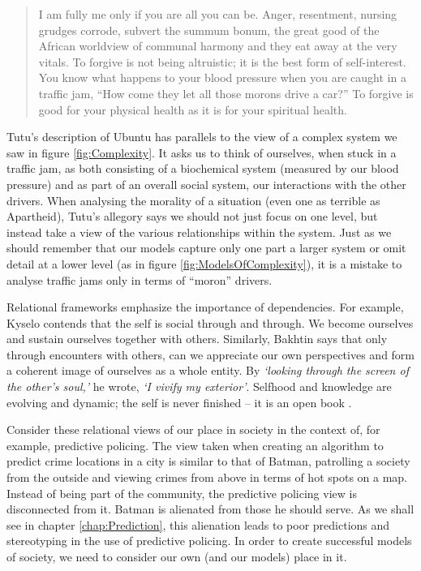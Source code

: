 \begin{quote}

I am fully me only if you are all you can be. Anger, resentment, nursing grudges corrode, subvert the summum bonum, the great good of the African worldview of communal harmony and they eat away at the very vitals. To forgive is not being altruistic; it is the best form of self-interest. You know what happens to your blood pressure when you are caught in a traffic jam, ``How come they let all those morons drive a car?'' To forgive is good for your physical health as it is for your spiritual health.

\end{quote}

Tutu's description of Ubuntu has parallels to the view of a complex system we saw in figure \ref{fig:Complexity}. It asks us to think of ourselves, when stuck in a traffic jam, as both consisting of a biochemical system (measured by our blood pressure) and as part of an overall social system, our interactions with the other drivers. When analysing the morality of a situation (even one as terrible as Apartheid), Tutu's allegory says we should not just focus on one level, but instead take a view of the various relationships within the system. Just as we should remember that our models capture only one part a larger system or omit detail at a lower level (as in figure \ref{fig:ModelsOfComplexity}), it is a mistake to analyse traffic jams only in terms of ``moron'' drivers. 

Relational frameworks emphasize the importance of dependencies. For example, Kyselo \cite{kyselo2014body} contends that the self is social through and through. We become ourselves and sustain ourselves together with others. Similarly, Bakhtin \cite{bakhtin1984problems} says that only through encounters with others, can we appreciate our own perspectives and form a coherent image of ourselves as a whole entity. By \textit{`looking through the screen of the other’s soul,'} he wrote, \textit{`I vivify my exterior'}. Selfhood and knowledge are evolving and dynamic; the self is never finished – it is an open book \cite{birhane2017descartes}. 

Consider these relational views of our place in society in the context of, for example, predictive policing. The view taken when creating an algorithm to predict crime locations in a city is similar to that of Batman, patrolling a society from the outside and viewing crimes from above in terms of hot spots on a map. Instead of being part of the community, the predictive policing view is disconnected from it. Batman is alienated from those he should serve. As we shall see in chapter \ref{chap:Prediction}, this alienation leads to poor predictions and stereotyping in the use of predictive policing. In order to create successful models of society, we need to consider our own (and our models) place in it. 

